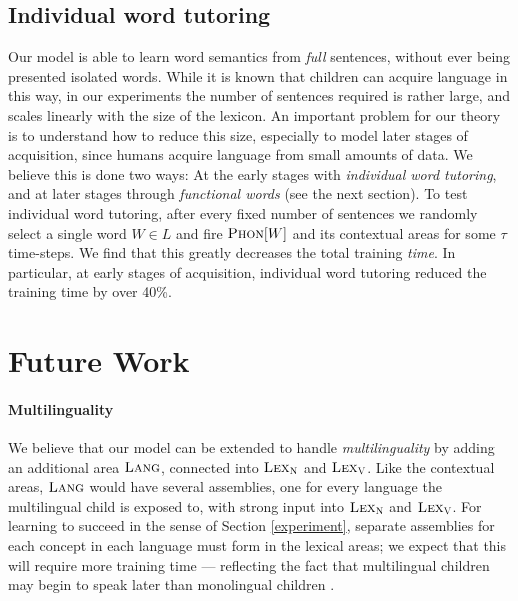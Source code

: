 \documentclass{article}
\newcommand{\LexV}{\textsc{Lex}_{\textsc{V}}}
\newcommand{\LexN}{\textsc{Lex}_{\textsc{N}}}
\newcommand{\Phon}{\textsc{Phon}}
\newcommand{\Lang}{\textsc{Lang}}
\begin{document}
\subsection*{Individual word tutoring} 
Our model is able to learn word semantics from \emph{full} sentences, without ever being presented isolated words. While it is known that children can  acquire language in this way, in our experiments the number of sentences required is rather large, and scales linearly with the size of the lexicon. An important problem for our theory is to understand how to reduce this size, especially to model later stages of acquisition, since humans acquire language from small amounts of data.  We believe this is done two ways: At the early stages with \emph{individual word tutoring}, and at later stages through {\em functional words} (see the next section).   To test individual word tutoring, after every fixed number of sentences we randomly select a single word $W \in L$ and fire $\Phon[W]$ and its contextual areas for some $\tau$ time-steps. We find that this greatly decreases the total training \emph{time}. %
In particular, at early stages of acquisition, individual word tutoring reduced the training time by over 40\%.

\section{Future Work} \label{open}
\paragraph{Multilinguality} 
We believe that our model can be extended to handle \emph{multilinguality} by adding an additional area $\Lang$, connected into $\LexN$ and $\LexV$. Like the contextual areas, $\Lang$ would have several assemblies, one for every language the multilingual child is exposed to, with strong input into $\LexN$ and $\LexV$. For learning to succeed in the sense of Section \ref{experiment}, separate assemblies for each concept in each language must form in the lexical areas; we expect that this will require more training time --- reflecting the fact that multilingual children may begin to speak later than monolingual children \citep{bilingualism}. 
\end{document}
